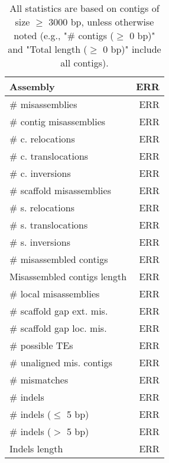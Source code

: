 \documentclass[12pt,a4paper]{article}
\begin{document}
\begin{table}[ht]
\begin{center}
\caption{All statistics are based on contigs of size $\geq$ 3000 bp, unless otherwise noted (e.g., "\# contigs ($\geq$ 0 bp)" and "Total length ($\geq$ 0 bp)" include all contigs).}
\begin{tabular}{|l*{1}{|r}|}
\hline
Assembly & ERR \\ \hline
\# misassemblies & ERR \\ \hline
\hspace{2mm}\# contig misassemblies & ERR \\ \hline
\hspace{5mm}\# c. relocations & ERR \\ \hline
\hspace{5mm}\# c. translocations & ERR \\ \hline
\hspace{5mm}\# c. inversions & ERR \\ \hline
\hspace{2mm}\# scaffold misassemblies & ERR \\ \hline
\hspace{5mm}\# s. relocations & ERR \\ \hline
\hspace{5mm}\# s. translocations & ERR \\ \hline
\hspace{5mm}\# s. inversions & ERR \\ \hline
\# misassembled contigs & ERR \\ \hline
Misassembled contigs length & ERR \\ \hline
\# local misassemblies & ERR \\ \hline
\# scaffold gap ext. mis. & ERR \\ \hline
\# scaffold gap loc. mis. & ERR \\ \hline
\# possible TEs & ERR \\ \hline
\# unaligned mis. contigs & ERR \\ \hline
\# mismatches & ERR \\ \hline
\# indels & ERR \\ \hline
\hspace{5mm}\# indels ($\leq$ 5 bp) & ERR \\ \hline
\hspace{5mm}\# indels ($>$ 5 bp) & ERR \\ \hline
Indels length & ERR \\ \hline
\end{tabular}
\end{center}
\end{table}
\end{document}

